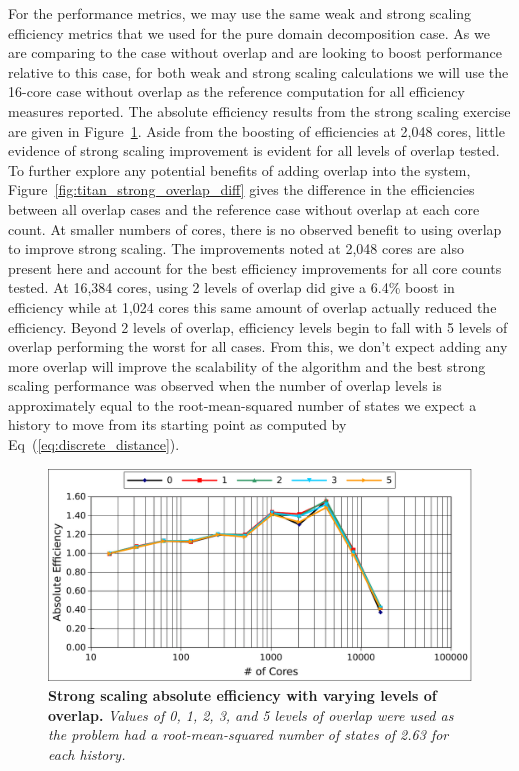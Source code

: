 For the performance metrics, we may use the same weak and strong
scaling efficiency metrics that we used for the pure domain
decomposition case. As we are comparing to the case without overlap
and are looking to boost performance relative to this case, for both
weak and strong scaling calculations we will use the 16-core case
without overlap as the reference computation for all efficiency
measures reported. The absolute efficiency results from the strong
scaling exercise are given in
Figure~\ref{fig:titan_strong_overlap}. Aside from the boosting of
efficiencies at 2,048 cores, little evidence of strong scaling
improvement is evident for all levels of overlap tested. To further
explore any potential benefits of adding overlap into the system,
Figure~\ref{fig:titan_strong_overlap_diff} gives the difference in the
efficiencies between all overlap cases and the reference case without
overlap at each core count. At smaller numbers of cores, there is no
observed benefit to using overlap to improve strong scaling. The
improvements noted at 2,048 cores are also present here and account
for the best efficiency improvements for all core counts tested. At
16,384 cores, using 2 levels of overlap did give a 6.4\% boost in
efficiency while at 1,024 cores this same amount of overlap actually
reduced the efficiency. Beyond 2 levels of overlap, efficiency levels
begin to fall with 5 levels of overlap performing the worst for all
cases. From this, we don't expect adding any more overlap will improve
the scalability of the algorithm and the best strong scaling
performance was observed when the number of overlap levels is
approximately equal to the root-mean-squared number of states we
expect a history to move from its starting point as computed by
Eq~(\ref{eq:discrete_distance}).

\begin{figure}[t!]
  \begin{center}
    \includegraphics[width=6in]{chapters/parallel_mc/titan_strong_overlap.pdf}
  \end{center}
  \caption{\textbf{Strong scaling absolute efficiency with varying
      levels of overlap.} \textit{Values of 0, 1, 2, 3, and 5 levels
      of overlap were used as the problem had a root-mean-squared
      number of states of 2.63 for each history.}}
  \label{fig:titan_strong_overlap}
\end{figure}


